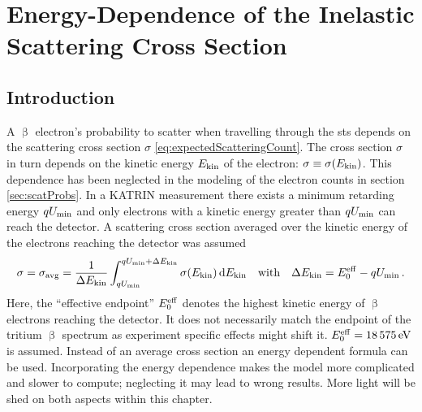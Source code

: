 

\chapter{Energy-Dependence of the Inelastic Scattering Cross Section}
\section{Introduction}
A $\upbeta$ electron's probability to scatter when travelling through the \gls{sts} depends on the scattering cross section $\sigma$ \eqref{eq:expectedScatteringCount}. The cross section $\sigma$ in turn depends on the kinetic energy $E_\mathrm{kin}$ of the electron: $\sigma \equiv \sigma(E_\mathrm{kin})$. This dependence has been neglected in the modeling of the electron counts in section \ref{sec:scatProbs}. In a KATRIN measurement there exists a minimum retarding energy $qU_\mathrm{min}$ and only electrons with a kinetic energy greater than $qU_\mathrm{min}$ can reach the detector. A scattering cross section averaged over the kinetic energy of the electrons reaching the detector was assumed
\begin{equation}
    \sigma = \sigma_\mathrm{avg} = 
    \frac{1}{\Delta E_\mathrm{kin}} 
    \int_{qU_\mathrm{min}}^{qU_\mathrm{min}+\Delta E_\mathrm{kin}} \sigma(E_\mathrm{kin}) \mathop{}\!\mathrm{d} E_\mathrm{kin} 
    \quad \text{with} \quad
    \Delta E_\mathrm{kin} = E_0^\mathrm{eff}-qU_\mathrm{min}
    \text{\,.}
\end{equation}
Here, the ``effective endpoint'' $E_0^\mathrm{eff}$ denotes the highest kinetic energy of $\upbeta$ electrons reaching the detector. It does not necessarily match the endpoint of the tritium $\upbeta$ spectrum as experiment specific effects might shift it. $E_0^\mathrm{eff}=\SI{18575}{eV}$ is assumed. Instead of an average cross section an energy dependent formula can be used. Incorporating the energy dependence makes the model more complicated and slower to compute; neglecting it may lead to wrong results. More light will be shed on both aspects within this chapter.

